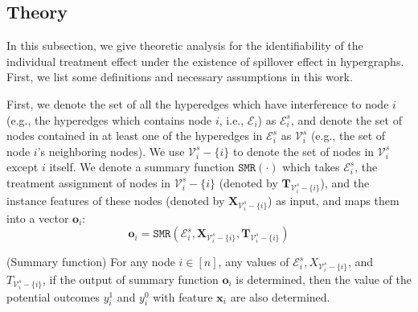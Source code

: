 \subsection{Theory}
In this subsection, we give theoretic analysis for the identifiability of the individual treatment effect under the existence of spillover effect in hypergraphs. First, we list some definitions and necessary assumptions in this work.

First, we denote the set of all the hyperedges which have interference to node $i$ (e.g., the hyperedges which contains node $i$, i.e., $\mathcal{E}_i$) as $\mathcal{E}^s_i$, and denote the set of nodes contained in at least one of the hyperedges in $\mathcal{E}^s_i$ as $\mathcal{V}^s_i$ (e.g., the set of node $i$'s neighboring nodes). We use  $\mathcal{V}^s_i-\{i\}$ to denote the set of nodes in $\mathcal{V}^s_i$ except $i$ itself. 
We denote a summary function $\mathtt{SMR}(\cdot)$ which takes $\mathcal{E}^s_i$, the treatment assignment of nodes in $\mathcal{V}^s_i-\{i\}$ (denoted by $\mathbf{T}_{\mathcal{V}^s_i-\{i\}}$), and the instance features of these nodes (denoted by $\mathbf{X}_{\mathcal{V}^s_i-\{i\}}$) as input, and maps them into a vector $\mathbf{o}_i$: 
\begin{equation}
     \mathbf{o}_i = \mathtt{SMR}(\mathcal{E}^s_i, \mathbf{X}_{\mathcal{V}^s_i-\{i\}}, \mathbf{T}_{\mathcal{V}^s_i-\{i\}})
 \end{equation}

\begin{assumption}
(Summary function) 
For any node $i\in[n]$, any values of $\mathcal{E}^s_i, {X}_{\mathcal{V}^s_i-\{i\}}$, and ${T}_{\mathcal{V}^s_i-\{i\}}$, if the output of summary function $\mathbf{o}_i$ is determined, then the value of the potential outcomes $y_i^{1}$ and $y_i^{0}$ with feature $\mathbf{x}_i$ are also determined. 
\label{assumption:summary}
\end{assumption}

